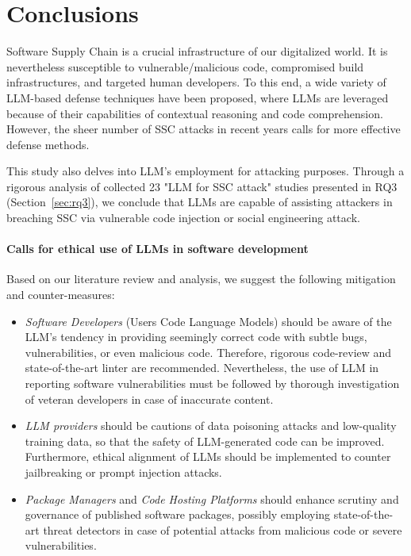 \section{Conclusions}\label{sec:conclude}

\par Software Supply Chain is a crucial infrastructure of
our digitalized world. It is nevertheless susceptible to 
vulnerable/malicious code, compromised build infrastructures,
and targeted human developers. To this end, a wide variety of
LLM-based defense techniques have been proposed, where LLMs
are leveraged because of their capabilities of contextual
reasoning and code comprehension.
However, the sheer number of SSC attacks in recent years
calls for more effective defense methods.

\par This study also delves into LLM's employment for attacking
purposes. Through a rigorous analysis of collected 23 "LLM for SSC attack"
studies presented in RQ3 (Section~\ref{sec:rq3}), we conclude that
LLMs are capable of assisting attackers in breaching SSC
via vulnerable code injection or social engineering attack.

\paragraph*{Calls for ethical use of LLMs in software development}
Based on our literature review and analysis, we suggest the following
mitigation and counter-measures:

\begin{itemize}
  \item \textit{Software Developers} (Users Code Language Models) 
  should be aware of the LLM's
  tendency in providing seemingly correct code with subtle
  bugs, vulnerabilities, or even malicious code. Therefore,
  rigorous code-review and state-of-the-art linter are recommended.
  Nevertheless, the use of LLM in reporting software vulnerabilities
  must be followed by thorough investigation of veteran developers
  in case of inaccurate content.

 \item \textit{LLM providers} should be cautions of data poisoning
 attacks and low-quality training data, so that the safety of LLM-generated
  code can be improved. Furthermore, ethical alignment of LLMs
  should be implemented to counter jailbreaking or prompt injection
  attacks. 

  \item \textit{Package Managers} and \textit{Code Hosting Platforms}
  should enhance scrutiny and governance of published software packages, possibly
  employing state-of-the-art threat detectors in case of potential
  attacks from malicious code or severe vulnerabilities.
\end{itemize}

